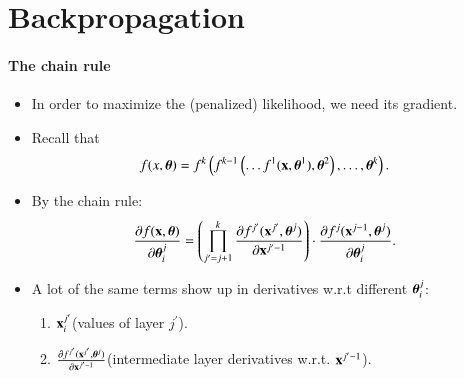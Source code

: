 \documentclass[notes, ignorenonframetext, compress, 10pt, xcolor=svgnames, aspectratio=169]{beamer}
\begin{document}
\section{Backpropagation}
\frame{\sectionpage}
\begin{frame}[allowframebreaks]{\insertsection}
\framesubtitle{The chain rule}
\begin{itemize}
\item In order to maximize the (penalized) likelihood, we need its gradient.
\item Recall that 
 \begin{align*}
  f(x,{\boldsymbol \theta}) &= f^k\left(f^{k-1}
  \left(\ldots f^1({\mathbf x}, {\boldsymbol \theta}^1), {\boldsymbol \theta}^2\right),\ldots, {\boldsymbol \theta}^k\right).
  \end{align*}
  \item By the chain rule:
  \begin{align*}
  \frac{\partial f({\mathbf x}, {\boldsymbol \theta})}{\partial {\boldsymbol \theta}_i^j} &=\left(\prod_{j^\prime = j+1}^k \frac{\partial f^{j^\prime}({\mathbf x}^{j^\prime}, {\boldsymbol \theta}^j)}
  {\partial {\mathbf x}^{j^\prime - 1} }\right)\cdot\frac{\partial f^j({\mathbf x}^{j-1}, {\boldsymbol \theta}^j)}{\partial {\boldsymbol \theta}_i^j}.
  \end{align*}
  \item A lot of the same terms show up in derivatives w.r.t different ${\boldsymbol \theta}^j_i$:
\begin{enumerate}[$\cdot$]
\item ${\mathbf x}^{j^\prime}_i$(values of layer $j^\prime$).
\item $\frac{\partial f^{j^\prime}({\mathbf x}^{j^\prime}, {\boldsymbol \theta}^j)}{\partial {\mathbf x}^{j^\prime - 1} }$(intermediate layer derivatives w.r.t. ${\mathbf x}^{j^\prime-1}$).

\end{enumerate}
\end{itemize}

\framebreak


\end{frame}
\end{document}
